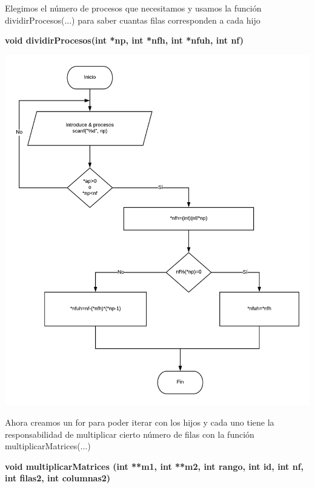 \documentclass[10pt,a4paper]{article}
\begin{document}
\begin{flushleft}
Elegimos el número de procesos que necesitamos y usamos la función dividirProcesos(...) para saber cuantas filas corresponden a cada hijo
\end{flushleft}

\begin{flushleft}
\textbf{void dividirProcesos(int *np, int *nfh, int *nfuh, int nf)}
\end{flushleft}

\begin{center}
	\includegraphics[scale=0.5]{dividirProcesos.png} 
\end{center}

\begin{flushleft}
Ahora creamos un for para poder iterar con los hijos y cada uno tiene la responsabilidad de multiplicar cierto número de filas con la función multiplicarMatrices(...)
\end{flushleft}

\begin{flushleft}
\textbf{void multiplicarMatrices (int **m1, int **m2, int rango, int id, int nf, int filas2, int columnas2)}
\end{flushleft}
\end{document}
